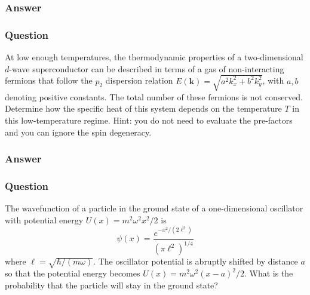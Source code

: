 \subsubsection{Answer}

\subsubsection{Question}
At low enough temperatures, the thermodynamic properties of a two-dimensional $d$-wave superconductor can be described in terms of a gas of non-interacting fermions that follow the $p_2$ dispersion relation $E(\mathbf{k}) = \sqrt{a^2 k_x^2 + b^2 k_y^2}$, with $a, b$ denoting positive constants. The total number of these fermions is not conserved. Determine how the specific heat of this system depends on the temperature $T$ in this low-temperature regime. Hint: you do not need to evaluate the pre-factors and you can ignore the spin degeneracy.
\subsubsection{Answer}



\subsubsection{Question}
The wavefunction of a particle in the ground state of a one-dimensional oscillator with potential energy $U(x) = m^2\omega^2 x^2 /2$ is
\begin{equation*}
	\psi(x) = \frac{e^{-x^2/(2\ell^2)}}{(\pi \ell^2)^{1/4}}
\end{equation*}
where $\ell=\sqrt{\hbar/(m\omega)}$. The oscillator potential is abruptly shifted by distance $a$ so that the potential energy becomes $U(x) = m^2 \omega^2 (x - a)^2/2.$ What is the probability that the particle will stay in the ground state?
